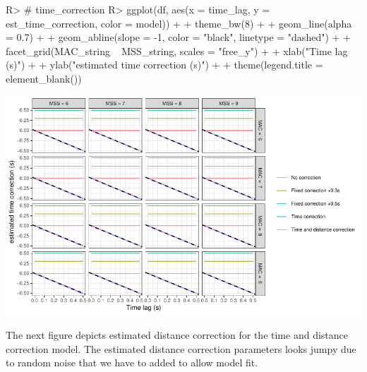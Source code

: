 \documentclass[
]{jss}
\begin{document}
\begin{CodeChunk}
\begin{CodeInput}
R> # time_correction
R> ggplot(df, aes(x = time_lag, y = est_time_correction, color = model)) +
+   theme_bw(8) +
+   geom_line(alpha = 0.7) +
+   geom_abline(slope = -1, color = "black", linetype = "dashed") +
+   facet_grid(MAC_string ~ MSS_string, scales = "free_y") +
+   xlab("Time lag (s)") +
+   ylab("estimated time correction (s)") +
+   theme(legend.title = element_blank())
\end{CodeInput}


\begin{center}\includegraphics[width=1\linewidth]{paper_files/figure-latex/unnamed-chunk-45-1} \end{center}

\end{CodeChunk}

The next figure depicts estimated distance correction for the time and distance correction model. The estimated distance correction parameters looks jumpy due to random noise that we have to added to allow model fit.
\end{document}
